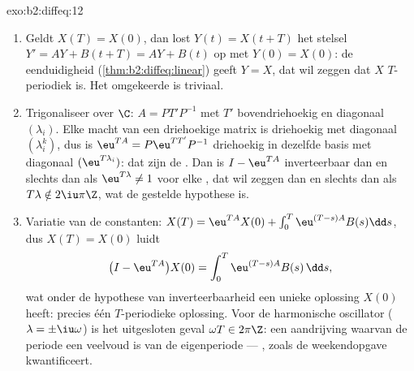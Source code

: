 \begin{solution}{exo:b2:diffeq:12}
\begin{enumerate}
  \item Geldt $X(T) = X(0)$, dan lost $Y(t) = X(t + T)$ het
        stelsel $Y' = AY + B(t + T) = AY + B(t)$ op met $Y(0) =
        X(0)$: de eenduidigheid
        (\cref{thm:b2:diffeq:linear}) geeft $Y = X$, dat wil
        zeggen dat $X$ $T$-periodiek is. Het omgekeerde is
        triviaal.
  \item Trigonaliseer over $\C$: $A = PT'P^{-1}$ met $T'$
        bovendriehoekig en diagonaal $(\lambda_i)$. Elke macht van
        een driehoekige matrix is driehoekig met diagonaal
        $(\lambda_i^k)$, dus is $\eu^{TA} = P\eu^{TT'}P^{-1}$
        driehoekig in dezelfde basis met diagonaal
        $(\eu^{T\lambda_i})$: dat zijn de . Dan is $I -
        \eu^{TA}$ inverteerbaar dan en slechts dan als
        $\eu^{T\lambda} \neq 1$ voor elke , dat wil
        zeggen dan en slechts dan als $T\lambda \notin
        2\iu\pi\Z$, wat de gestelde hypothese is.
  \item Variatie van de constanten: $X(T) = \eu^{TA}X(0) +
        \int_0^T\eu^{(T-s)A}B(s)\dd s$, dus $X(T) = X(0)$ luidt
        \[
        \bigl(I - \eu^{TA}\bigr)X(0) =
        \int_0^{T}\eu^{(T-s)A}B(s)\,\dd s ,
        \]
        wat onder de hypothese van inverteerbaarheid een unieke
        oplossing $X(0)$ heeft: precies één $T$-periodieke
        oplossing. Voor de harmonische oscillator ($\lambda =
        \pm\iu\omega$) is het uitgesloten geval $\omega T \in
        2\pi\Z$: een aandrijving waarvan de periode een veelvoud is
        van de eigenperiode --- , zoals de
        weekendopgave kwantificeert.
\end{enumerate}
\end{solution}

